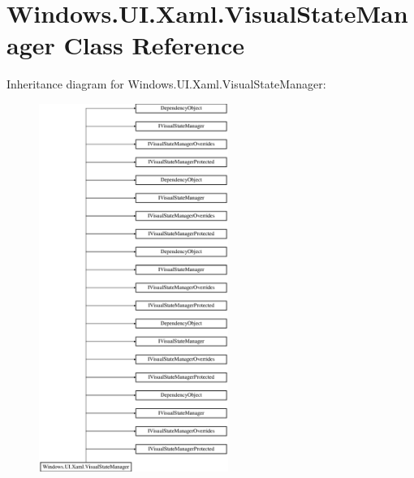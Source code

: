 \hypertarget{class_windows_1_1_u_i_1_1_xaml_1_1_visual_state_manager}{}\section{Windows.\+U\+I.\+Xaml.\+Visual\+State\+Manager Class Reference}
\label{class_windows_1_1_u_i_1_1_xaml_1_1_visual_state_manager}
Inheritance diagram for Windows.\+U\+I.\+Xaml.\+Visual\+State\+Manager\+:\begin{figure}[H]
\begin{center}
\leavevmode
\includegraphics[height=12.000000cm]{class_windows_1_1_u_i_1_1_xaml_1_1_visual_state_manager}
\end{center}
\end{figure}
